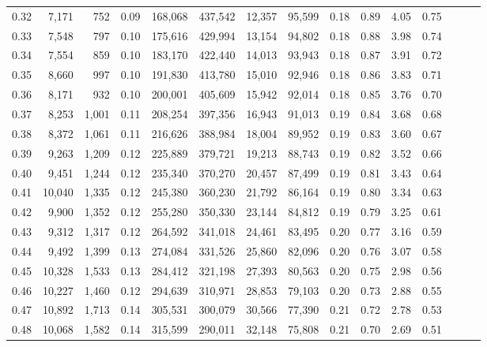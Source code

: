 \begin{tabular}{rrrrrrrrrrrrrrr}
0.32 &   7,171 &    752 &  0.09 &  168,068 &  437,542 &   12,357 &   95,599 &  0.18 &  0.89 &  4.05 &      0.75 \\
0.33 &   7,548 &    797 &  0.10 &  175,616 &  429,994 &   13,154 &   94,802 &  0.18 &  0.88 &  3.98 &      0.74 \\
0.34 &   7,554 &    859 &  0.10 &  183,170 &  422,440 &   14,013 &   93,943 &  0.18 &  0.87 &  3.91 &      0.72 \\
0.35 &   8,660 &    997 &  0.10 &  191,830 &  413,780 &   15,010 &   92,946 &  0.18 &  0.86 &  3.83 &      0.71 \\
0.36 &   8,171 &    932 &  0.10 &  200,001 &  405,609 &   15,942 &   92,014 &  0.18 &  0.85 &  3.76 &      0.70 \\
0.37 &   8,253 &  1,001 &  0.11 &  208,254 &  397,356 &   16,943 &   91,013 &  0.19 &  0.84 &  3.68 &      0.68 \\
0.38 &   8,372 &  1,061 &  0.11 &  216,626 &  388,984 &   18,004 &   89,952 &  0.19 &  0.83 &  3.60 &      0.67 \\
0.39 &   9,263 &  1,209 &  0.12 &  225,889 &  379,721 &   19,213 &   88,743 &  0.19 &  0.82 &  3.52 &      0.66 \\
0.40 &   9,451 &  1,244 &  0.12 &  235,340 &  370,270 &   20,457 &   87,499 &  0.19 &  0.81 &  3.43 &      0.64 \\
0.41 &  10,040 &  1,335 &  0.12 &  245,380 &  360,230 &   21,792 &   86,164 &  0.19 &  0.80 &  3.34 &      0.63 \\
0.42 &   9,900 &  1,352 &  0.12 &  255,280 &  350,330 &   23,144 &   84,812 &  0.19 &  0.79 &  3.25 &      0.61 \\
0.43 &   9,312 &  1,317 &  0.12 &  264,592 &  341,018 &   24,461 &   83,495 &  0.20 &  0.77 &  3.16 &      0.59 \\
0.44 &   9,492 &  1,399 &  0.13 &  274,084 &  331,526 &   25,860 &   82,096 &  0.20 &  0.76 &  3.07 &      0.58 \\
0.45 &  10,328 &  1,533 &  0.13 &  284,412 &  321,198 &   27,393 &   80,563 &  0.20 &  0.75 &  2.98 &      0.56 \\
0.46 &  10,227 &  1,460 &  0.12 &  294,639 &  310,971 &   28,853 &   79,103 &  0.20 &  0.73 &  2.88 &      0.55 \\
0.47 &  10,892 &  1,713 &  0.14 &  305,531 &  300,079 &   30,566 &   77,390 &  0.21 &  0.72 &  2.78 &      0.53 \\
0.48 &  10,068 &  1,582 &  0.14 &  315,599 &  290,011 &   32,148 &   75,808 &  0.21 &  0.70 &  2.69 &      0.51 \\

\end{tabular}

